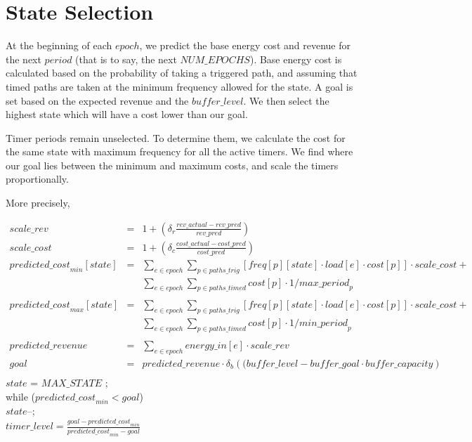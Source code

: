 \documentclass{article}
\begin{document}
\section{State Selection}

At the beginning of each ${epoch}$, we predict the base energy cost and revenue for the next ${period}$ (that is to say, the next ${NUM\_EPOCHS}$).  Base energy cost is calculated based on the probability of taking a triggered path, and assuming that timed paths are taken at the minimum frequency allowed for the state. A goal is set based on the expected revenue and the ${buffer\_level}$.  We then select the highest state which will have a cost lower than our goal.

Timer periods remain unselected.  To determine them, we calculate the cost for the same state with maximum frequency for all the active timers.  We find where our goal lies between the minimum and maximum costs, and scale the timers proportionally.


More precisely,

\begin{eqnarray*}
{scale\_rev} & = & 1 + \left(\delta_r\frac{{rev\_actual}-{rev\_pred}}{{rev\_pred}}\right) \\
{scale\_cost} & =&  1 + \left(\delta_c\frac{{cost\_actual}-{cost\_pred}}{{cost\_pred}}\right) \\
{predicted\_cost}_{min}[{state}]&  =&  \sum_{e\in{epoch}}\sum_{p\in{paths\_trig}}\left[ {freq}[p][{state}] \cdot {load}[e] \cdot {cost}[p] \right] \cdot {scale\_cost} +\\
                          &  &  \sum_{e\in{epoch}}\sum_{p\in{paths\_timed}}{cost}[p]\cdot1/{max\_period}_p \\\\
{predicted\_cost}_{max}[{state}]&  =&  \sum_{e\in{epoch}}\sum_{p\in{paths\_trig}}\left[ {freq}[p][{state}] \cdot {load}[e] \cdot {cost}[p] \right] \cdot {scale\_cost} +\\
                          &  &   \sum_{e\in{epoch}}\sum_{p\in{paths\_timed}}{cost}[p]\cdot1/{min\_period}_p \\\\
{predicted\_revenue}&  =&  \sum_{e\in{epoch}} {energy\_in}[e] \cdot {scale\_rev}\\
{goal} & = & {predicted\_revenue} \cdot \delta_b\left(({buffer\_level} - {buffer\_goal}\cdot{buffer\_capacity}\right)
\\
\end{eqnarray*}
\ttfamily
${state}$ = ${MAX\_STATE}$ ;\\
while (${predicted\_cost}_{min} < {goal}$) \\
\hspace{1cm}${state}$--;\\
\({timer\_level} = \frac{{goal} - {predicted\_cost}_{min}}{{predicted\_cost}_{min} - {goal}}\)
    
\end{document}
